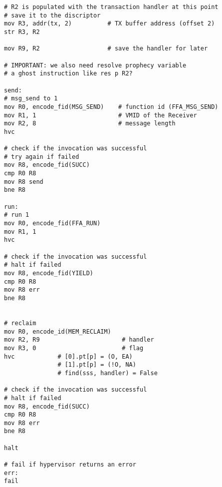 \documentclass{article}
\begin{document}
\begin{lstlisting}[caption={VM 0}]
# R2 is populated with the transaction handler at this point
# save it to the discriptor
mov R3, addr(tx, 2)          # TX buffer address (offset 2)
str R3, R2

mov R9, R2                   # save the handler for later

# IMPORTANT: we also need resolve prophecy variable
# a ghost instruction like res p R2?

send:
# msg_send to 1
mov R0, encode_fid(MSG_SEND)    # function id (FFA_MSG_SEND)
mov R1, 1                       # VMID of the Receiver
mov R2, 8                       # message length
hvc

# check if the invocation was successful
# try again if failed
mov R8, encode_fid(SUCC)
cmp R0 R8
mov R8 send
bne R8

run:
# run 1
mov R0, encode_fid(FFA_RUN)
mov R1, 1
hvc

# check if the invocation was successful
# halt if failed
mov R8, encode_fid(YIELD)
cmp R0 R8
mov R8 err
bne R8


# reclaim
mov R0, encode_id(MEM_RECLAIM)
mov R2, R9                       # handler
mov R3, 0                        # flag
hvc            # [0].pt[p] = (O, EA)
               # [1].pt[p] = (!O, NA)
               # find(sss, handler) = False

# check if the invocation was successful
# halt if failed
mov R8, encode_fid(SUCC)
cmp R0 R8
mov R8 err
bne R8

halt

# fail if hypervisor returns an error
err:
fail

\end{lstlisting}
\end{document}
